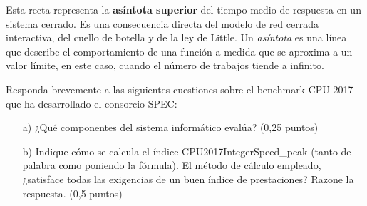 \documentclass[a4paper,12pt]{article}
\begin{document}
        Esta recta representa la \textbf{asíntota superior} del tiempo medio de respuesta en un sistema cerrado. Es una consecuencia directa del modelo de red cerrada interactiva, del cuello de botella y de la ley de Little. Un \textit{asíntota} es una línea que describe el comportamiento de una función a medida que se aproxima a un valor límite, en este caso, cuando el número de trabajos tiende a infinito.
        
        \begin{tcolorbox}[colback=gray!10, colframe=black, title=6.- (0.75 puntos)]
        Responda brevemente a las siguientes cuestiones sobre el benchmark CPU 2017 que ha desarrollado el consorcio SPEC:

        \begin{enumerate}
            \item[a)] ¿Qué componentes del sistema informático evalúa? (0,25 puntos)
            \item[b)] Indique cómo se calcula el índice CPU2017IntegerSpeed\_peak (tanto de palabra como poniendo la fórmula). El método de cálculo empleado, ¿satisface todas las exigencias de un buen índice de prestaciones? Razone la respuesta. (0,5 puntos)
        \end{enumerate}
        \end{tcolorbox}
\end{document}
